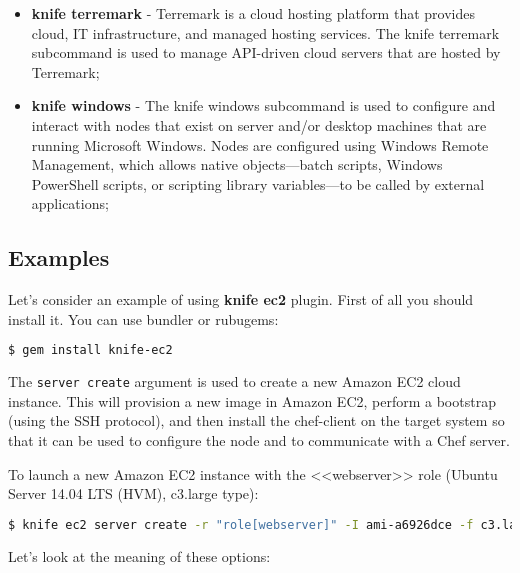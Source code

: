 \begin{itemize}
  \item \textbf{knife terremark} - Terremark is a cloud hosting platform that provides cloud, IT infrastructure, and managed hosting services. The knife terremark subcommand is used to manage API-driven cloud servers that are hosted by Terremark;
  \item \textbf{knife windows} - The knife windows subcommand is used to configure and interact with nodes that exist on server and/or desktop machines that are running Microsoft Windows. Nodes are configured using Windows Remote Management, which allows native objects—batch scripts, Windows PowerShell scripts, or scripting library variables—to be called by external applications;
\end{itemize}


\subsection{Examples}

Let's consider an example of using \textbf{knife ec2} plugin. First of all you should install it. You can use bundler or rubugems:

\begin{lstlisting}[language=Bash,label=lst:knife-plugins1]
$ gem install knife-ec2
\end{lstlisting}

The \lstinline!server create! argument is used to create a new Amazon EC2 cloud instance. This will provision a new image in Amazon EC2, perform a bootstrap (using the SSH protocol), and then install the chef-client on the target system so that it can be used to configure the node and to communicate with a Chef server.

To launch a new Amazon EC2 instance with the <<webserver>> role (Ubuntu Server 14.04 LTS (HVM), c3.large type):

\begin{lstlisting}[language=Bash,label=lst:knife-plugins2]
$ knife ec2 server create -r "role[webserver]" -I ami-a6926dce -f c3.large -G www,default -x ubuntu -N server01 -A aws-access-key-id -K aws-secret-access-key -S aws/servers.pem
\end{lstlisting}

Let's look at the meaning of these options:

